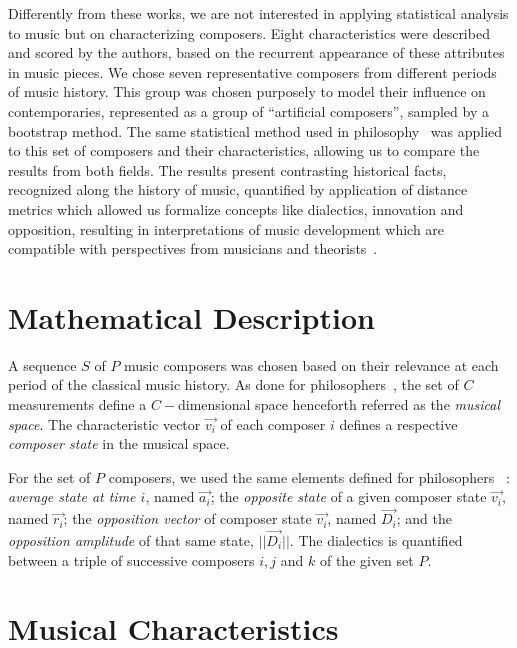\documentclass[
 aip,
 jmp,
 amsmath,amssymb,
 reprint,
]{revtex4-1}
\begin{document}
Differently from these works, we are not interested in applying
statistical analysis to music but on characterizing composers.
Eight characteristics were described and scored by the authors, based
on the recurrent appearance of these attributes in music pieces.
We chose seven representative composers from different periods of
music history. 
This group was chosen purposely to model their
influence on contemporaries, represented as a group of
``artificial composers'', sampled by a bootstrap
method.
The same statistical method used in
philosophy~\cite{Fabbri} was applied to this set of composers and their
characteristics, allowing us to compare the results from both fields.
The
results present contrasting historical facts, recognized along
the history of music, quantified by application of
distance metrics which allowed us formalize
concepts like dialectics, innovation and opposition, resulting in
interpretations of music development which are
compatible with perspectives from musicians and
theorists~\cite{Webern, Lovelock}.

\section{Mathematical Description}

A sequence $S$ of $P$ music composers was chosen based on their
relevance at each period of the classical music history.
As done for philosophers~\cite{Fabbri}, the set of $C$ measurements
define a $C-$dimensional space henceforth referred as the \emph{musical space}.  
The characteristic vector $\vec{v_i}$ of each composer $i$ defines a respective
\emph{composer state} in the musical space.  


For the set of
$P$ composers, we used the same elements defined for philosophers
~\cite{Fabbri}: \emph{average state at time $i$}, named $\vec{a_i}$;
the \emph{opposite state} of a given composer state $\vec{v_i}$, named $\vec{r_i}$;
the \emph{opposition vector} of composer state $\vec{v_i}$, named
$\vec{D_i}$; and the \emph{opposition
amplitude} of that same state, $|| \vec{D_i} ||$.
The dialectics is quantified between a triple of successive composers
 $i, j$ and $k$ of the given set $P$.


\section{Musical Characteristics}
\end{document}
